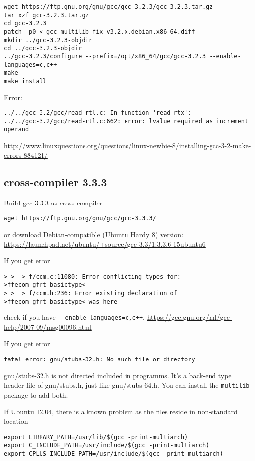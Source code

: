   
\begin{verbatim}
wget https://ftp.gnu.org/gnu/gcc/gcc-3.2.3/gcc-3.2.3.tar.gz
tar xzf gcc-3.2.3.tar.gz
cd gcc-3.2.3
patch -p0 < gcc-multilib-fix-v3.2.x.debian.x86_64.diff
mkdir ../gcc-3.2.3-objdir
cd ../gcc-3.2.3-objdir
../gcc-3.2.3/configure --prefix=/opt/x86_64/gcc/gcc-3.2.3 --enable-languages=c,c++
make
make install
\end{verbatim}
Error:
\begin{verbatim}
../../gcc-3.2/gcc/read-rtl.c: In function 'read_rtx':
../../gcc-3.2/gcc/read-rtl.c:662: error: lvalue required as increment operand
\end{verbatim}
\url{http://www.linuxquestions.org/questions/linux-newbie-8/installing-gcc-3-2-make-errors-884121/}

\subsection{cross-compiler 3.3.3}
\label{sec:cross-compiler-GNU_3.3.3}

Build gcc 3.3.3 as cross-compiler
\begin{verbatim}
wget https://ftp.gnu.org/gnu/gcc/gcc-3.3.3/
\end{verbatim}
or download Debian-compatible (Ubuntu Hardy 8) version: \url{https://launchpad.net/ubuntu/+source/gcc-3.3/1:3.3.6-15ubuntu6}

If you get error
\begin{verbatim}
> >  > f/com.c:11080: Error conflicting types for: >ffecom_gfrt_basictype<
> >  > f/com.h:236: Error existing declaration of >ffecom_gfrt_basictype< was here
\end{verbatim}
check if you have \verb!--enable-languages=c,c++!.
\url{https://gcc.gnu.org/ml/gcc-help/2007-09/msg00096.html}

If you get error
\begin{verbatim}
fatal error: gnu/stubs-32.h: No such file or directory
\end{verbatim}
gnu/stubs-32.h is not directed included in programms. It's a back-end type
header file of gnu/stubs.h, just like gnu/stubs-64.h. You can install the
\verb!multilib! package to add both.

If Ubuntu 12.04, there is a known problem as the files reside in non-standard location
\begin{verbatim}
export LIBRARY_PATH=/usr/lib/$(gcc -print-multiarch)
export C_INCLUDE_PATH=/usr/include/$(gcc -print-multiarch)
export CPLUS_INCLUDE_PATH=/usr/include/$(gcc -print-multiarch)
\end{verbatim}

